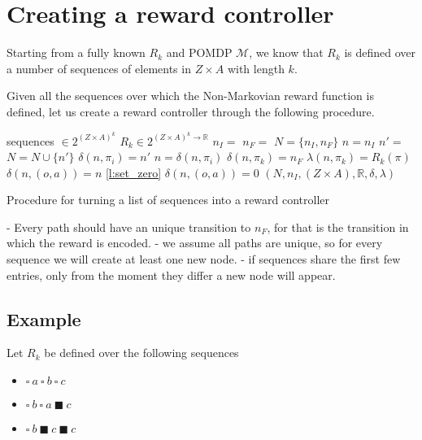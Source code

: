 \section{Creating a reward controller}
Starting from a fully known $R_k$ and POMDP $\mathcal{M}$, we know that $R_k$ is defined over a number of sequences of elements in $Z\times A$ with length $k$.

Given all the sequences over which the Non-Markovian reward function is defined, let us create a reward controller through the following procedure.
\begin{algorithm}[H]
	\begin{algorithmic}[1]
		\Require sequences $\in 2^{(Z\times A)^k}$
		\Require $R_k \in 2^{(Z\times A)^k\to \mathbb{R}}$
		\State $n_I = $  
		\State $n_F = $  
		\State $N=\{n_I,n_F\}$
			\State $n = n_I$
					\State $n'=$  
					\State $N = N \cup \{n'\}$		
					\State $\delta(n,\pi_i) = n'$	
				\EndIf 
				\State $n = \delta(n,\pi_i)$     
			\EndFor
			\State $\delta(n,\pi_k) = n_F$ 
			\State $\lambda(n,\pi_k) = R_k(\pi)$ 
		\EndFor
		 
				 
					\State $\delta(n,(o,a)) = n$
				\EndIf
				 \ref{l:set_zero}
					\State $\delta(n,(o,a)) = 0 $
				\EndIf
			\EndFor
		\EndFor
		\State \Return $(N,n_I,(Z\times A),\mathbb{R},\delta,\lambda)$
		\EndProcedure
	\end{algorithmic}
	\caption{Procedure for turning a list of sequences into a reward controller}
\end{algorithm}

- Every path should have an unique transition to $n_F$, for that is the transition in which the reward is encoded.
- we assume all paths are unique, so for every sequence we will create at least one new node.
- if sequences share the first few entries, only from the moment they differ a new node will appear. 



\subsection*{Example}
Let $R_k$ be defined over the following sequences
\begin{itemize}
	\item $\square\ a\ \square\ b\ \square\ c$
	\item $\square\ b\ \square\ a\ \blacksquare\ c$
	\item $\square\ b\ \blacksquare\ c\ \blacksquare\ c$
\end{itemize}

